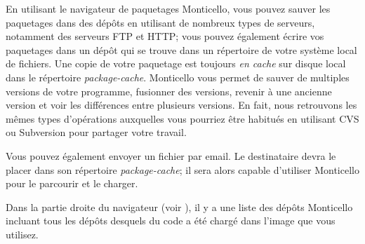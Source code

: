 \documentclass[a4paper,10pt,twoside]{book}
\begin{document}
En utilisant le navigateur de paquetages Monticello, vous pouvez sauver les paquetages dans des dépôts en utilisant de nombreux types de serveurs, notamment des serveurs FTP et HTTP; vous pouvez également écrire vos paquetages dans un dépôt qui se trouve dans un répertoire de votre système local de fichiers.
Une copie de votre paquetage est toujours \emph{en cache} sur disque local dans le répertoire \emph{package-cache}. 
Monticello vous permet de sauver de multiples versions de votre programme, fusionner des versions, revenir à une ancienne version et voir les différences entre plusieurs versions.
En fait, nous retrouvons les m\^emes types d'opérations auxquelles vous
pourriez \^etre habitués en utilisant CVS ou Subversion pour
partager votre travail.


Vous pouvez également envoyer un fichier  par email.
Le destinataire devra le placer dans son répertoire \emph{package-cache}; il sera alors capable d'utiliser Monticello pour le parcourir et le charger. 

Dans la partie droite du navigateur (voir ), il y a une liste des dépôts Monticello incluant tous les dépôts desquels du code a été chargé dans l'image que vous utilisez. 
\end{document}
